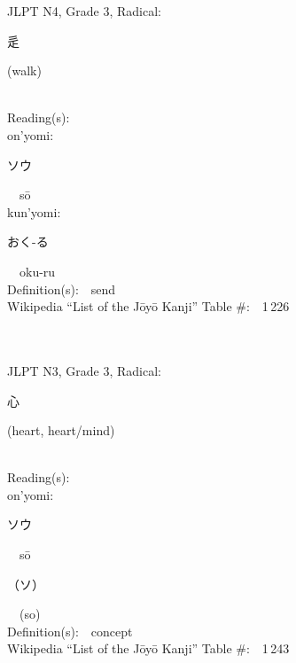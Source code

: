 \begin{multicols}{2}
{JLPT N4, Grade 3, Radical:\ \ {\begin{CJK}{UTF8}{min} 辵 \end{CJK}} (walk) } \\
Reading(s):\ \ \\
{\hspace*{1em}}on'yomi:\ \ \\
{\hspace*{2em}}{\begin{CJK}{UTF8}{min} ソウ \end{CJK}}\ \ s\=o\ \ \\
{\hspace*{1em}}kun'yomi:\ \ \\
{\hspace*{2em}}{\begin{CJK}{UTF8}{min} おく-る \end{CJK}}\ \ oku-ru\ \ \\
Definition(s):\ \ send \\
Wikipedia ``List of the J\=oy\=o Kanji'' Table \#:\ \ 1\,226 \\
\ \ \\
{\fontsize{34pt}{40pt}  }\ \ \\  %
{JLPT N3, Grade 3, Radical:\ \ {\begin{CJK}{UTF8}{min} 心 \end{CJK}} (heart, heart/mind) } \\
Reading(s):\ \ \\
{\hspace*{1em}}on'yomi:\ \ \\
{\hspace*{2em}}{\begin{CJK}{UTF8}{min} ソウ \end{CJK}}\ \ s\=o\ \ \\
{\hspace*{2em}}{\begin{CJK}{UTF8}{min} （ソ） \end{CJK}}\ \ (so)\ \ \\
Definition(s):\ \ concept \\
Wikipedia ``List of the J\=oy\=o Kanji'' Table \#:\ \ 1\,243 \\
\ \ \\
{\fontsize{34pt}{40pt}  }\ \ \\  %

\end{multicols}

